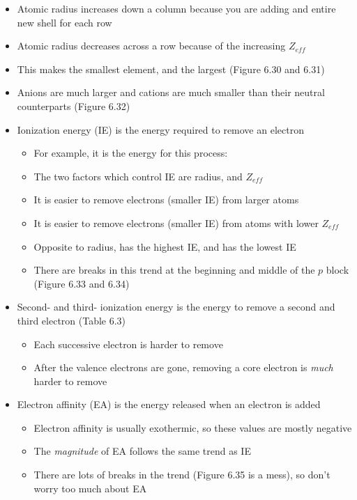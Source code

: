 \documentclass[12pt, openany, letterpaper]{memoir}
\begin{document}
\begin{itemize}
\begin{itemize}
            Practice: Find $Z_{eff}$ for the same elements using Slater's rules ($2.85$, $5.45$, and $7.6$)
    \end{itemize}
	\item Atomic radius increases down a column because you are adding and entire new shell for each row
	\item Atomic radius decreases across a row because of the increasing $Z_{eff}$
	\item This makes  the smallest element, and  the largest (Figure 6.30 and 6.31)
	\item Anions are much larger and cations are much smaller than their neutral counterparts (Figure 6.32)
  \item Ionization energy (IE) is the energy required to remove an electron
    \begin{itemize}
      \item For example, it is the energy for this process: 
      \item The two factors which control IE are radius, and $Z_{eff}$
      \item It is easier to remove electrons (smaller IE) from larger atoms
      \item It is easier to remove electrons (smaller IE) from atoms with lower $Z_{eff}$
      \item Opposite to radius,  has the highest IE, and  has the lowest IE
      \item There are breaks in this trend at the beginning and middle of the $p$ block (Figure 6.33 and 6.34)
    \end{itemize}
	\item Second- and third- ionization energy is the energy to remove a second and third electron (Table 6.3)
    \begin{itemize}
      \item Each successive electron is harder to remove
      \item After the valence electrons are gone, removing a core electron is \emph{much} harder to remove
    \end{itemize}
	\item Electron affinity (EA) is the energy released when an electron is added
    \begin{itemize}
      \item Electron affinity is usually exothermic, so these values are mostly negative
      \item The \emph{magnitude} of EA follows the same trend as IE
      \item There are lots of breaks in the trend (Figure 6.35 is a mess), so don't worry too much about EA
    \end{itemize}
\end{itemize}
\end{document}
